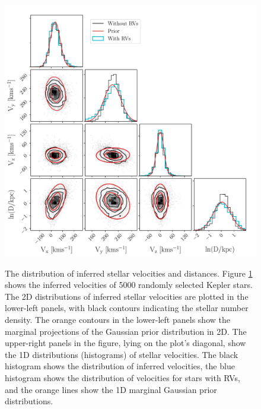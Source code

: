 \begin{figure}[ht!]
\caption{
The distribution of inferred stellar velocities and distances.
    Figure \ref{fig:results} shows the inferred velocities of 5000 randomly
selected Kepler stars.
The 2D distributions of inferred stellar velocities are plotted in the
lower-left panels, with black contours indicating the stellar number density.
The orange contours in the lower-left panels show the marginal projections of
    the Gaussian prior distribution in 2D.
The upper-right panels in the figure, lying on the plot's diagonal, show the
    1D distributions (histograms) of stellar velocities.
The black histogram shows the distribution of inferred velocities, the blue
histogram shows the distribution of velocities for stars with RVs,
and the orange lines show the 1D marginal Gaussian prior distributions.
}
  \centering
    \includegraphics[width=1\textwidth]{results}
\label{fig:results}
\end{figure}


